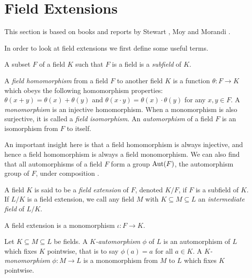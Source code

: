 \section{Field Extensions} \label{sec:ext}
This section is based on books and reports by Stewart \cite[Chapters~4-5]{Stewart}, Moy \cite{Moy} and Morandi \cite[Chapter~1]{ morandi_field_1996}. 

In order to look at field extensions we first define some useful terms. 
\begin{definition}
 A subset $F$ of a field \(K\) such that $F$ is a field is a \textit{subfield}
 of $K$.
\end{definition}
\begin{definition}
	A \textit{field homomorphism} from a field $F$ to another field $K$ is a function $\theta: F \to K$ which obeys the following homomorphism properties: $\theta(x + y) = \theta(x) + \theta(y)$ and $\theta(x\cdot y) = \theta(x) \cdot \theta(y)$ for any $x, y \in F$. 
    A \textit{monomorphism} is an injective homomorphism. 
	When a monomorphism is also surjective, it is called a \textit{field isomorphism}. An \textit{automorphism} of a field $F$ is an isomorphism from $F$ to itself.
\end{definition}

An important insight here is that a field homomorphism is always injective, and hence a field homomorphism is always a field monomorphism.
We can also find that all automorphisms of a field $F$ form a group $\operatorname{Aut}(F)$, the automorphism group of $F$, under composition \cite[p.~15]{morandi_field_1996}.

\begin{definition}
A field \(K\) is said to be a \textit{field extension} of \(F\), denoted \(K / F\), if \(F\) is a subfield of \(K\). If $L/K$ is a field extension, we call any field $M$ with $K \subseteq M \subseteq L$ an \textit{intermediate field} of $L/K$. 
\end{definition}

A field extension is a monomorphism \(\iota: F \to K\). 

\begin{definition} \label{def:automorphism}
	Let $K \subseteq M \subseteq L$ be fields. A \textit{$K$-automorphism} $\phi$ of $L$ is an automorphism of $L$ which fixes $K$ pointwise, that is to say $\phi(a) = a$ for all $a \in K$. 
	A \textit{$K$-monomorphism} $\phi : M \to L$ is a monomorphism from $M$ to $L$ which fixes $K$ pointwise. 
\end{definition}

